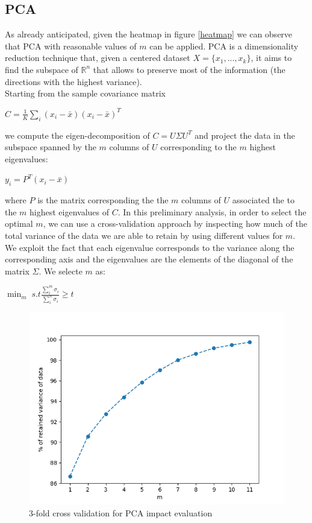 \documentclass[10pt, a4paper, twocolumn]{article} %
\begin{document}
\subsection{PCA}
As already anticipated, given the heatmap in figure \ref{heatmap} we can observe that PCA
with reasonable values of $m$ can be applied. 
PCA is a dimensionality reduction technique that, given a centered dataset $X = \{x_{1}, ..., x_{k}\}$, it aims to find the subspace of 
$\mathbb{R}^{n}$ that allows to preserve most of the information (the directions with the
highest variance).\\Starting from the sample covariance matrix
\begin{center}
	\begin{math}
		C = \frac{1}{K} \sum_{i}^{}(x_{i} - \bar{x})(x_{i}-\bar{x})^T
	\end{math}
\end{center}
we compute the eigen-decomposition of $C = U\Sigma U^T$ and project the data in the subspace
spanned by the $m$ columns of $U$ corresponding to the $m$ highest eigenvalues:
\begin{center}
	\begin{math}
		y_{i} = P^T(x_{i}-\bar{x})
	\end{math}
\end{center}
where $P$ is the matrix corresponding the the $m$ columns of $U$ associated the to
the $m$ highest eigenvalues of $C$.
In this preliminary analysis, in order to select the optimal $m$, we can use a cross-validation approach by inspecting how much
of the total variance of the data we are able to retain by using different values for $m$. We exploit the fact
that each eigenvalue corresponds to the variance along the corresponding axis and the
eigenvalues are the elements of the diagonal of the matrix $\Sigma$. We selecte $m$ as:
\begin{center}
	\begin{math}
		\min_m\;s.t \frac{\sum_{i}^{m}\sigma_{i}}{\sum_{i}^{n}\sigma_{i}} \ge t
	\end{math}
\end{center}
\begin{figure}[ht!]
	\includegraphics[width=\linewidth]{./Pictures/FeaturesAnalysis/pca.png}
	\caption{3-fold cross validation for PCA impact evaluation}
	\label{pca} 
\end{figure}
\end{document}
